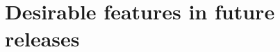 \documentclass{article}
\begin{document}
\section*{Desirable features in future releases}


\end{document}
